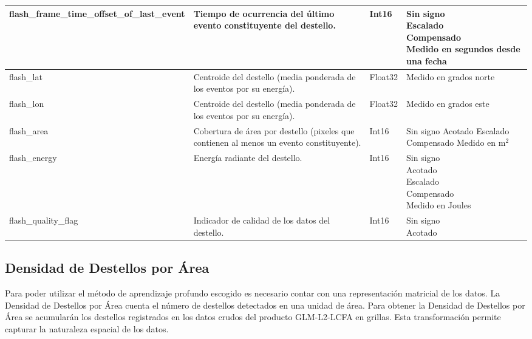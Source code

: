 \begin{table}[H]
\begin{tabular}{l|p{3cm}|p{1.15cm}|p{3.5cm}}
    flash\_frame\_time\_offset\_of\_last\_event &
    Tiempo de ocurrencia del último evento constituyente del destello. &
    Int16 &
    \parbox[t]{3.5cm}{Sin signo \\ Escalado \\ Compensado \\ Medido en segundos desde una fecha}\\ \hline

    flash\_lat &
    Centroide del destello (media ponderada de los eventos por su energía). &
    Float32 &
    \parbox[t]{3.5cm}{Medido en grados norte}\\ \hline

    flash\_lon &
    Centroide del destello (media ponderada de los eventos por su energía). &
    Float32 &
    \parbox[t]{3.5cm}{Medido en grados este}\\ \hline

    flash\_area &
    Cobertura de área por destello (pixeles que contienen al menos un evento constituyente). &
    Int16 &
    \parbox[t]{3.5cm}{Sin signo \\ Acotado \\ Escalado \\ Compensado \\ Medido en m$^2$}\\ \hline

    flash\_energy &
    Energía radiante del destello. &
    Int16 &
    \parbox[t]{3.5cm}{Sin signo \\ Acotado \\ Escalado \\ Compensado \\ Medido en Joules}\\ \hline

    flash\_quality\_flag &
    Indicador de calidad de los datos del destello. &
    Int16 &
    \parbox[t]{3.5cm}{Sin signo \\ Acotado }\\ 

  \end{tabular}
\end{table}

\subsection{Densidad de Destellos por Área}
Para poder utilizar el método de aprendizaje profundo escogido es necesario 
contar con una representación matricial de los datos.
La Densidad de Destellos por Área cuenta el número de destellos detectados en
una unidad de área.
Para obtener la Densidad de Destellos por Área se acumularán los destellos
registrados en los datos crudos del producto GLM-L2-LCFA en grillas.
Esta transformación permite capturar la naturaleza espacial de los datos.

